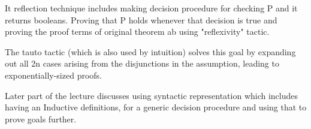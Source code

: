 \documentclass[paper=a4, fontsize=11pt]{scrartcl}
\numberwithin{equation}{section}		%
\numberwithin{figure}{section}			%
\numberwithin{table}{section}				%
\begin{document}
It reflection technique includes making decision procedure for checking P and it returns booleans. Proving that P holds whenever that decision is true and proving the proof terms of original theorem ab using "reflexivity"  tactic.

The tauto tactic (which is also used by intuition) solves this goal by expanding out all 2n cases arising from the disjunctions in the assumption, leading to exponentially-sized proofs.

Later part of the lecture discusses using syntactic representation which includes having an Inductive definitions, for a generic decision procedure and using that to prove goals further. 
\end{document}
